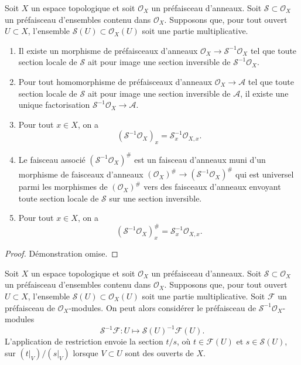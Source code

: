 \begin{lemma}
\label{lemma-simple-invert}
Soit $X$ un espace topologique et soit $\mathcal{O}_X$ un
préfaisceau d'anneaux. Soit $\mathcal{S} \subset \mathcal{O}_X$
un préfaisceau d'ensembles contenu dans $\mathcal{O}_X$.
Supposons que, pour tout ouvert $U \subset X$, l'ensemble
$\mathcal{S}(U) \subset \mathcal{O}_X(U)$ soit une partie multiplicative.
\begin{enumerate}
\item Il existe un morphisme de préfaisceaux d'anneaux
$\mathcal{O}_X \to \mathcal{S}^{-1}\mathcal{O}_X$
tel que toute section locale de $\mathcal{S}$ ait pour image une section
inversible de $\mathcal{S}^{-1}\mathcal{O}_X$.
\item Pour tout homomorphisme de préfaisceaux d'anneaux
$\mathcal{O}_X \to \mathcal{A}$ tel que toute section locale
de $\mathcal{S}$ ait pour image une section inversible de $\mathcal{A}$,
il existe une unique factorisation
$\mathcal{S}^{-1}\mathcal{O}_X \to \mathcal{A}$.
\item Pour tout $x \in X$, on a
$$
(\mathcal{S}^{-1}\mathcal{O}_X)_x = \mathcal{S}_x^{-1} \mathcal{O}_{X, x}.
$$
\item Le faisceau associé $(\mathcal{S}^{-1}\mathcal{O}_X)^\#$ est un
faisceau d'anneaux muni d'un morphisme de faisceaux d'anneaux
$(\mathcal{O}_X)^\# \to (\mathcal{S}^{-1}\mathcal{O}_X)^\#$
qui est universel parmi les morphismes de $(\mathcal{O}_X)^\#$ vers des
faisceaux d'anneaux envoyant toute section locale de $\mathcal{S}$ sur une
section inversible.
\item Pour tout $x \in X$, on a
$$
(\mathcal{S}^{-1}\mathcal{O}_X)^\#_x = \mathcal{S}_x^{-1} \mathcal{O}_{X, x}.
$$
\end{enumerate}
\end{lemma}

\begin{proof}
Démonstration omise.
\end{proof}

\noindent
Soit $X$ un espace topologique et soit $\mathcal{O}_X$ un
préfaisceau d'anneaux. Soit $\mathcal{S} \subset \mathcal{O}_X$
un préfaisceau d'ensembles contenu dans $\mathcal{O}_X$.
Supposons que, pour tout ouvert $U \subset X$, l'ensemble
$\mathcal{S}(U) \subset \mathcal{O}_X(U)$ soit une partie multiplicative.
Soit $\mathcal{F}$ un préfaisceau de $\mathcal{O}_X$-modules.
On peut alors considérer le préfaisceau de
$\mathcal{S}^{-1}\mathcal{O}_X$-modules
$$
\mathcal{S}^{-1}\mathcal{F} :
U \longmapsto \mathcal{S}(U)^{-1}\mathcal{F}(U).
$$
L'application de restriction envoie la section $t/s$, où
$t \in \mathcal{F}(U)$ et $s \in \mathcal{S}(U)$, sur
$(t|_V)/(s|_V)$ lorsque $V \subset U$ sont des ouverts de $X$.

